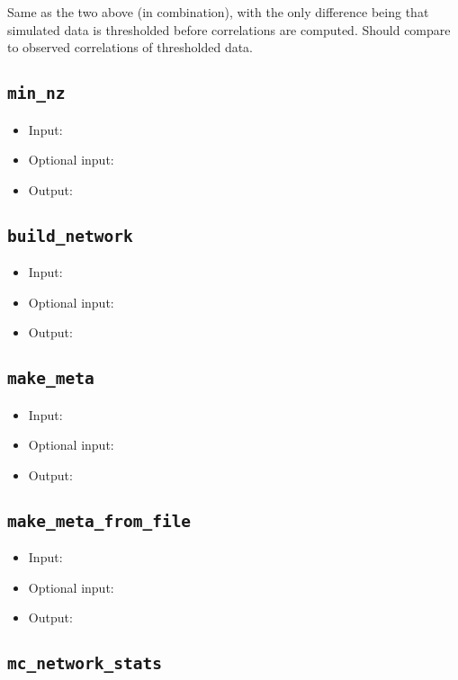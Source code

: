 \documentclass[10pt]{article}
\theoremstyle{definition}
\numberwithin{theorem}{section}
\numberwithin{definition}{section}
\numberwithin{lemma}{section}
\numberwithin{corollary}{section}
\numberwithin{clm}{section}
\numberwithin{rmk}{section}
\begin{document}
Same as the two above (in combination), with the only difference being that simulated data is thresholded before correlations are computed. Should compare to observed correlations of thresholded data. 

\cprotect \subsection{\verb|min_nz|}

\begin{itemize}
	\item Input: 
	\item Optional input:
	\item Output: 
\end{itemize}

\cprotect \subsection{\verb|build_network|}

\begin{itemize}
	\item Input: 
	\item Optional input:
	\item Output: 
\end{itemize}

\cprotect \subsection{\verb|make_meta|}

\begin{itemize}
	\item Input: 
	\item Optional input:
	\item Output: 
\end{itemize}

\cprotect \subsection{\verb|make_meta_from_file|}

\begin{itemize}
	\item Input: 
	\item Optional input:
	\item Output: 
\end{itemize}

\cprotect \subsection{\verb|mc_network_stats|}
\end{document}
